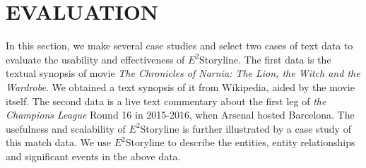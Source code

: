 \documentclass[review,journal]{vgtc}         %
\begin{document}
\section{EVALUATION}
\noindent In this section, we make several case studies and select two cases of text data to evaluate the usability and effectiveness of $E^2$Storyline. The first data is the textual synopsis of movie \textit{The Chronicles of Narnia: The Lion, the Witch and the Wardrobe}. We obtained a text synopsis of it from Wikipedia, aided by the movie itself. The second data is a live text commentary about the first leg of \textit{the Champions League} Round 16 in 2015-2016, when Arsenal hosted Barcelona. The usefulness and scalability of $E^2$Storyline is further illustrated by a case study of this match data. We use $E^2$Storyline to describe the entities, entity relationships and significant events in the above data.

\end{document}
